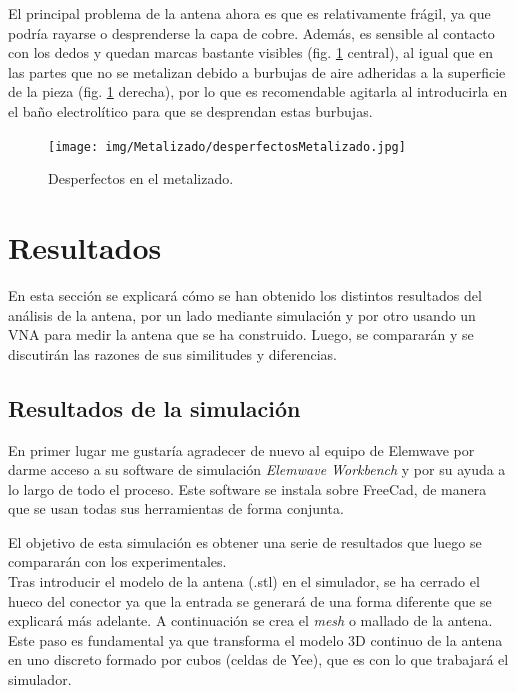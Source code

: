 \documentclass[11pt,a4paper,twoside,pdf]{article}
\numberwithin{equation}{section}
\begin{document}
El principal problema de la antena ahora es que es relativamente frágil, ya que podría rayarse o desprenderse la capa de cobre. Además, es sensible al contacto con los dedos y quedan marcas bastante visibles (fig. \ref{fig:desperfectosMetalizado} central), al igual que en las partes que no se metalizan debido a burbujas de aire adheridas a la superficie de la pieza (fig. \ref{fig:desperfectosMetalizado} derecha), por lo que es recomendable agitarla al introducirla en el baño electrolítico para que se desprendan estas burbujas.
\begin{figure}[!h]
    \centering
    \texttt{[image: img/Metalizado/desperfectosMetalizado.jpg]}
    \vspace{-0.5cm}
    \caption{Desperfectos en el metalizado.}
    \label{fig:desperfectosMetalizado}
\end{figure}


\section{Resultados}

En esta sección se explicará cómo se han obtenido los distintos resultados del análisis de la antena, por un lado mediante simulación y por otro usando un VNA para medir la antena que se ha construido. Luego, se compararán y se discutirán las razones de sus similitudes y diferencias.

\subsection{Resultados de la simulación}

En primer lugar me gustaría agradecer de nuevo al equipo de Elemwave por darme acceso a su software de simulación \textit{Elemwave Workbench} y por su ayuda a lo largo de todo el proceso. Este software se instala sobre FreeCad, de manera que se usan todas sus herramientas de forma conjunta.

El objetivo de esta simulación es obtener una serie de resultados que luego se compararán con los experimentales.\\

Tras introducir el modelo de la antena (.stl) en el simulador, se ha cerrado el hueco del conector ya que la entrada se generará de una forma diferente que se explicará más adelante. A continuación se crea el \textit{mesh} o mallado de la antena. Este paso es fundamental ya que transforma el modelo 3D continuo de la antena en uno discreto formado por cubos (celdas de Yee), que es con lo que trabajará el simulador. 
\end{document}
